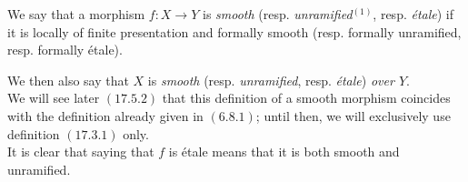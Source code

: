 \begin{definition}[17.3.1]
\label{IV.17.3.1}
We say that a morphism $f : X \to Y$ is \emph{smooth} (resp. \emph{unramified}$^{(1)}$, resp. \emph{\'etale}) %
if it is locally of finite presentation and formally smooth (resp. formally unramified, resp. formally \'etale).
\end{definition}
We then also say that $X$ is \emph{smooth} (resp. \emph{unramified}, resp. \emph{\'etale}) \emph{over $Y$}.\\
We will see later $(\hyperref[IV.17.5.2]{17.5.2})$ that this definition of a smooth morphism coincides with the definition already given in $(\hyperref[IV.6.8.1]{6.8.1})$; until then, we will exclusively use definition $(\hyperref[IV.17.3.1]{17.3.1})$ only.\\
It is clear that saying that $f$ is \'etale means that it is both smooth and unramified.




